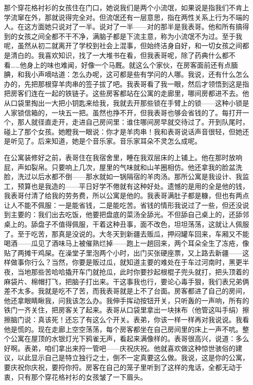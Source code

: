 那个穿花格衬衫的女孩住在门口，她说我们是两个小流氓，如果说是指我们不肯上学流窜在外，那就说得完全对。但流氓还有一层意思，指在两性关系上行为不端的人。在这方面她只说对了一半。说对了一半——对的那半是我表哥。他和所有搞得到的女孩之间全都不干不净，满脑子都是下流主意，称为小流氓不为过。至于我呢，虽然从初二就离开了学校到社会上混事，但始终洁身自好，和一切女孩之间都是清白的。我喜欢知识，找了一大堆书在看，但我表哥呢，除了药典什么都不看……他身上的味也难闻，好像一个马厩。就这么个家伙，在房客面前还有点腼腆，和我小声嘀咕道：怎么办呢，这可都是些有学问的人哪。我说，还有什么怎么办的，先把那根穿羊肉串的签子拔了吧。我表哥看了我一眼，然后才领悟到这是指把房客们连在一起的铁链子。这些房客都站在公寓的走廊里，哪间房都进不去。他从口袋里掏出一大把小钥匙来给我，我就去开那些锁在手臂上的锁——这种小锁是人家锁信箱的，一块五一把。虽然也挣不开，但我表哥也够会省钱的了。每打开一个，那人就径直走开，走进自己房间里：谁住哪间房早就交待过了。开到队尾时，碰上了那个女孩。她瞪我一眼说：你才是羊肉串！我和表哥说话声音很轻，但她还是听见了。后来知道，她是个音乐家。音乐家耳朵不灵怎么成呢。 

在公寓装修好之前，表哥住在我宿舍里，睡在我双层床的上铺上。他在那时放响屁，声如裂帛。只要响上几次，屋里的气味就和山羊圈相仿。他还拿我的脸盆洗脸，洗过以后水都不倒——那水就如一锅隔宿的羊肉汤。那所公寓是我设计、我监工，预算也是我造的——平日好学不倦就有这种好处。遗憾的是用的全是他的钱，我表哥付清了给我的劳务费，所以公寓是他的。我表哥满肚子都是糠，但也有两点让人不能不佩服：一是能省钱，二是能吃苦。省钱的情形我说过了一些，但还没说到主要的：我们出去吃饭，他要把盘底的菜汤全舔光。不但舔自己桌上的，还舔邻桌上的。舔盘子不值得佩服，干着这种丑事，面不改色，坦坦荡荡，这就让人佩服了。至于吃苦，那真是没说的。大冬天到新疆去贩瓜，押闷罐车回来，车厢又不能喝酒——瓜见了酒味马上被催熟烂掉——跑上一趟回来，两个耳朵全生了冻疮，像贴了两摊干鸡屎。在澡堂子里泡两个小时，出门买张硬座票，又上路去新疆——这样做事你行么？当然，你要是贩过瓜，就知道主要的难处在于车过河南时，黑更半夜，当地那些苦哈哈撬开车门就抢瓜，此时你要抄起根棍子兜头就打，把头顶着的麻袋片、棉帽打飞，把脑子打出来。干这事我也行，要论心毒手狠，我们表兄弟俩差不太多。我就是吃不了苦，而我表哥就是上不了台面。房客都进了自己的房间，他还拿眼睛瞅我，问我该怎么办。我伸手挥动按钮开关，只听轰的一声响，所有的铁门一齐关住，把房客关了起来。表哥从口袋里拿出一块抹布（他管这叫手绢）擦擦脑门说：真该死！还忘了有这么个开关。表弟，你该一样一样再对我说说。我看他是慌的。现在走廊上空空荡荡，每个房客都坐在自己房间里的床上一声不吭。整个公寓在屋顶的水银灯光下鸦雀无声，看起来满像样的。表哥很高兴，说道：多么好啊。表弟，咱们拿出来捋一管吧——庆祝庆祝。他就喜欢做这种惊世骇俗的建议，以此显示自己是特立独行之士，倒不一定真要这么做。我说，这是你的公寓，要庆祝你庆祝，要捋你捋。房客在自己的笼子里听到了这样的鬼话，全都无动于衷，只有那个穿花格衬衫的女孩皱了一下眉头。 



